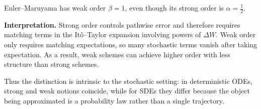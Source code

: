 \documentclass[11pt]{article}
\begin{document}
Euler--Maruyama has weak order $\beta = 1$, even though its strong order is $\alpha = \tfrac12$.
\medskip

\noindent
\textbf{Interpretation.}
Strong order controls pathwise error and therefore requires matching terms in
the It\^{o}--Taylor expansion involving powers of $\Delta W$.
Weak order only requires matching expectations, so many stochastic terms vanish
after taking expectation.  As a result, weak schemes can achieve higher order
with less structure than strong schemes.

Thus the distinction is intrinsic to the stochastic setting: in deterministic
ODEs, strong and weak notions coincide, while for SDEs they differ because the
object being approximated is a probability law rather than a single trajectory.
\end{document}
